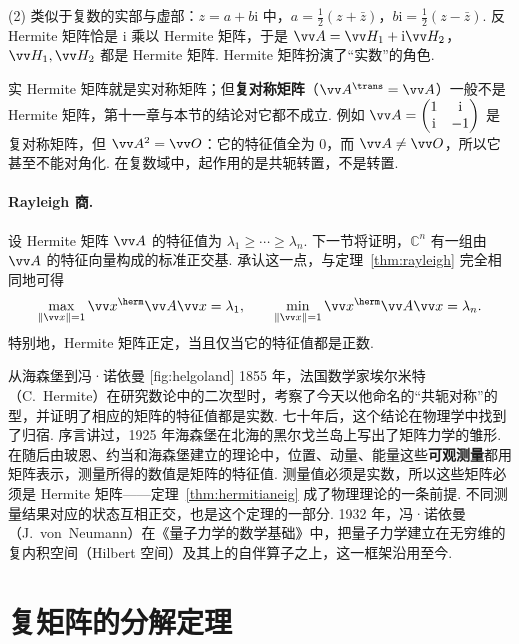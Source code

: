 	(2) 类似于复数的实部与虚部：$z=a+b\mathrm i$ 中，$a=\frac12(z+\bar z)$，$b\mathrm i=\frac12(z-\bar z)$. 反 Hermite 矩阵恰是 $\mathrm i$ 乘以 Hermite 矩阵，于是 $\vv A=\vv H_1+\mathrm i\vv H_2$，$\vv H_1,\vv H_2$ 都是 Hermite 矩阵. Hermite 矩阵扮演了“实数”的角色.
	
	\begin{pitfallbox}
		实 Hermite 矩阵就是实对称矩阵；但\textbf{复对称矩阵}（$\vv A^\trans=\vv A$）一般不是 Hermite 矩阵，第十一章与本节的结论对它都不成立. 例如 $\vv A=\begin{pmatrix}1&\mathrm i\\\mathrm i&-1\end{pmatrix}$ 是复对称矩阵，但 $\vv A^2=\vv O$：它的特征值全为 $0$，而 $\vv A\ne\vv O$，所以它甚至不能对角化. 在复数域中，起作用的是共轭转置，不是转置.
	\end{pitfallbox}
	
	\paragraph*{Rayleigh 商.} 设 Hermite 矩阵 $\vv A$ 的特征值为 $\lambda_1\ge\cdots\ge\lambda_n$. 下一节将证明，$\mathbb{C}^n$ 有一组由 $\vv A$ 的特征向量构成的标准正交基. 承认这一点，与定理~\ref{thm:rayleigh} 完全相同地可得
	\[\max_{\|\vv x\|=1}\vv x^\herm\vv A\vv x=\lambda_1,\qquad\min_{\|\vv x\|=1}\vv x^\herm\vv A\vv x=\lambda_n.\]
	特别地，Hermite 矩阵正定，当且仅当它的特征值都是正数.
	
	\begin{historybox}{从海森堡到冯·诺依曼}
		[fig:helgoland]
		1855 年，法国数学家埃尔米特（C.~Hermite）在研究数论中的二次型时，考察了今天以他命名的“共轭对称”的型，并证明了相应的矩阵的特征值都是实数. 七十年后，这个结论在物理学中找到了归宿. 序言讲过，1925 年海森堡在北海的黑尔戈兰岛上写出了矩阵力学的雏形. 在随后由玻恩、约当和海森堡建立的理论中，位置、动量、能量这些\textbf{可观测量}都用矩阵表示，测量所得的数值是矩阵的特征值. 测量值必须是实数，所以这些矩阵必须是 Hermite 矩阵——定理~\ref{thm:hermitianeig} 成了物理理论的一条前提. 不同测量结果对应的状态互相正交，也是这个定理的一部分. 1932 年，冯·诺依曼（J.~von~Neumann）在《量子力学的数学基础》中，把量子力学建立在无穷维的复内积空间（Hilbert 空间）及其上的自伴算子之上，这一框架沿用至今.
	\end{historybox}
	
	\section{\hC 复矩阵的分解定理}\label{sec:complexdecomp}
	
